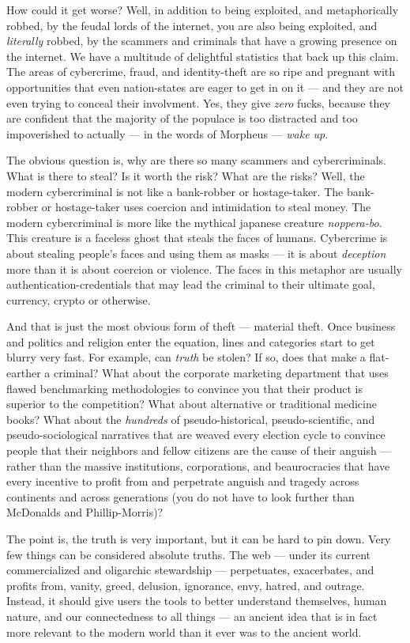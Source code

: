 \documentclass[a4paper]{article}
\begin{document}
How could it get worse? Well, in addition to being exploited, and metaphorically robbed, by the feudal lords of the internet, you are also being exploited, and \emph{literally} robbed, by the scammers and criminals that have a growing presence on the internet. We have a multitude of delightful statistics that back up this claim. The areas of cybercrime, fraud, and identity-theft are so ripe and pregnant with opportunities that even nation-states are eager to get in on it ---  and they are not even trying to conceal their involvment. Yes, they give \emph{zero} fucks, because they are confident that the majority of the populace is too distracted and too impoverished to actually ---  in the words of Morpheus ---  \emph{wake up}.

The obvious question is, why are there so many scammers and cybercriminals. What is there to steal? Is it worth the risk? What are the risks? Well, the modern cybercriminal is not like a bank-robber or hostage-taker. The bank-robber or hostage-taker uses coercion and intimidation to steal money. The modern cybercriminal is more like the mythical japanese creature \emph{noppera-bo}. This creature is a faceless ghost that steals the faces of humans. Cybercrime is about stealing people's faces and using them as masks ---  it is about \emph{deception} more than it is about coercion or violence. The faces in this metaphor are usually authentication-credentials that may lead the criminal to their ultimate goal, currency, crypto or otherwise.

And that is just the most obvious form of theft ---  material theft. Once business and politics and religion enter the equation, lines and categories start to get blurry very fast. For example, can \emph{truth} be stolen? If so, does that make a flat-earther a criminal? What about the corporate marketing department that uses flawed benchmarking methodologies to convince you that their product is superior to the competition? What about alternative or traditional medicine books? What about the \emph{hundreds} of pseudo-historical, pseudo-scientific, and pseudo-sociological narratives that are weaved every election cycle to convince people that their neighbors and fellow citizens are the cause of their anguish ---  rather than the massive institutions, corporations, and beaurocracies that have every incentive to profit from and perpetrate anguish and tragedy across continents and across generations (you do not have to look further than McDonalds and Phillip-Morris)?

The point is, the truth is very important, but it can be hard to pin down. Very few things can be considered absolute truths. The web ---  under its current commercialized and oligarchic stewardship ---  perpetuates, exacerbates, and profits from, vanity, greed, delusion, ignorance, envy, hatred, and outrage. Instead, it should give users the tools to better understand themselves, human nature, and our connectedness to all things ---  an ancient idea that is in fact more relevant to the modern world than it ever was to the ancient world.
\end{document}
